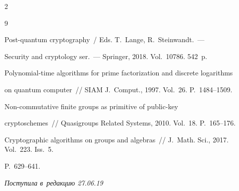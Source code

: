 \begin{multicols}{2}
{{\begin{thebibliography}{9}


Post-quantum cryptography~/ Eds. T.~Lange, R.~Steinwandt.~--- 


Security and cryptology ser.~--- Springer, 2018. Vol.~10786. 542~p.




 Polynomial-time algorithms for prime factorization and discrete logarithms 


on quantum computer~// SIAM J.~Comput., 1997. Vol.~26. P.~1484--1509.




 Non-commutative finite groups as primitive of public-key 


cryptoschemes~// Quasigroups Related Systems, 2010. Vol.~18. P.~165--176.






Cryptographic algorithms on groups and algebras~// J.~Math. Sci., 2017. Vol.~223. Iss.~5. 


P.~629--641.


\end{thebibliography}





 }


 }





\end{multicols}





\vspace*{-6pt}





\hfill{\small\textit{Поступила в~редакцию 27.06.19}}





\vspace*{8pt}










\newpage





\vspace*{-28pt}






